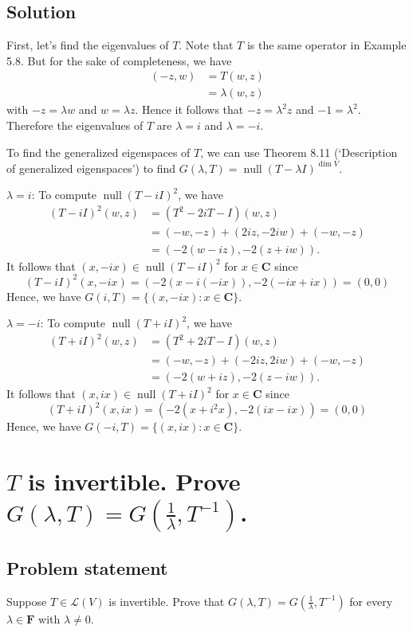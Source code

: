 \documentclass{article}
\begin{document}
\subsection*{Solution}
First, let's find the eigenvalues of $T$. Note that $T$ is the same operator in Example 5.8. But for the sake of completeness, we have
\begin{align*}
    (-z,w)&=T(w,z)\\
    &=\lambda (w,z)
\end{align*}
with $-z=\lambda w$ and $w=\lambda z$. Hence it follows that $-z=\lambda^2z$ and $-1=\lambda^2$. Therefore the eigenvalues of $T$ are $\lambda=i$ and $\lambda=-i$.

To find the generalized eigenspaces of $T$, we can use Theorem 8.11 (`Description of generalized eigenspaces') to find $G(\lambda,T)=\operatorname{null}(T-\lambda I)^{\operatorname{dim}V}$.

$\lambda=i$: To compute $\operatorname{null}(T-i I)^{2}$, we have
\begin{align*}
    (T-i I)^{2}(w,z)&=(T^2-2iT-I)(w,z)\\
    &=(-w,-z)+(2iz,-2iw)+(-w,-z)\\
    &=(-2(w-iz),-2(z+iw)).
\end{align*}
It follows that $(x,-ix)\in\operatorname{null}(T-i I)^{2}$ for $x\in\mathbf{C}$ since 
\[(T-i I)^{2}(x,-ix)=(-2(x-i(-ix)),-2(-ix+ix))=(0,0)\]
Hence, we have $G(i,T)=\{(x,-ix):x\in\mathbf{C}\}$.

$\lambda=-i$: To compute $\operatorname{null}(T+i I)^{2}$, we have
\begin{align*}
    (T+i I)^{2}(w,z)&=(T^2+2iT-I)(w,z)\\
    &=(-w,-z)+(-2iz,2iw)+(-w,-z)\\
    &=(-2(w+iz),-2(z-iw)).
\end{align*}
It follows that $(x,ix)\in\operatorname{null}(T+i I)^{2}$ for $x\in\mathbf{C}$ since 
\[(T+i I)^{2}(x,ix)=(-2(x+i^2x),-2(ix-ix))=(0,0)\]
Hence, we have $G(-i,T)=\{(x,ix):x\in\mathbf{C}\}$.

\clearpage

\section{$T$ is invertible. Prove $G(\lambda,T)=G(\frac{1}{\lambda},T^{-1})$.}
\subsection*{Problem statement}
Suppose $T\in\mathcal{L}(V)$ is invertible. Prove that $G(\lambda,T)=G(\frac{1}{\lambda},T^{-1})$ for every $\lambda\in\mathbf{F}$ with $\lambda\neq 0$.
\end{document}
